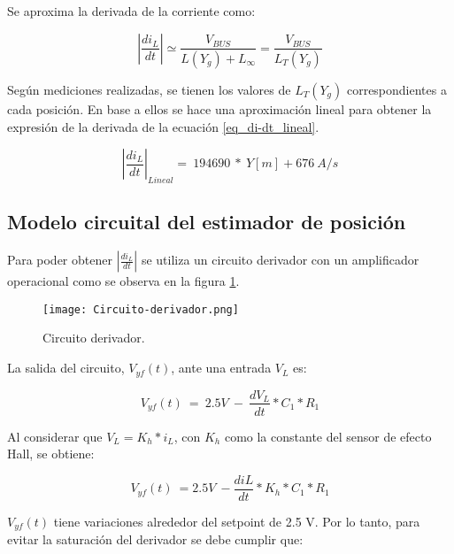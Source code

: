 \noindent Se aproxima la derivada de la corriente como:

\begin{equation} \label{eq_derivadaAproximacion}
	\left|\frac{{di}_L}{dt}\right|\simeq \frac{V_{BUS}}{L(Y_g)+L_{\infty }}=\frac{V_{BUS}}{L_T(Y_g)}
\end{equation}

\noindent Seg\'{u}n mediciones realizadas, se tienen los valores de $L_T(Y_g)$ correspondientes a cada posici\'{o}n. En base a ellos se hace una aproximaci\'{o}n lineal para obtener la expresi\'{o}n de la derivada de la ecuaci\'{o}n \ref{eq_di-dt_lineal}.

\noindent 

\begin{equation} \label{eq_di-dt_lineal}
{\left|\frac{{di}_L}{dt}\right|}_{Lineal}=\ 194690\ *\ Y[m]+676\ A/s
\end{equation}

\subsection{Modelo circuital del estimador de posici\'{o}n}

\noindent Para poder obtener $\left|\frac{{di}_L}{dt}\right|$ se utiliza un circuito derivador con un amplificador operacional como se observa en la figura  \ref{fig:img_Circuito-derivador}.

\begin{figure}[H]
	\centering
	\texttt{[image: Circuito-derivador.png]}
	\caption{Circuito derivador.}
	\label{fig:img_Circuito-derivador}
\end{figure}

\noindent La salida del circuito, $V_{yf}(t)$, ante una entrada $V_L$ es:

\begin{equation} \label{eq_vyf1}
	V_{yf}(t)\ =\ 2.5V\ -\ \frac{dV_L}{dt}*C_1*R_1
\end{equation}


\noindent Al considerar que $V_L=K_h*i_L$, con $K_h$ como la constante del sensor de efecto Hall, se obtiene: 

\begin{equation} \label{eq_vyf2}
	V_{yf}(t)\ =2.5V\ -\frac{diL}{dt}*K_h*C_1*R_1
\end{equation}

\noindent $V_{yf}(t)$ tiene variaciones alrededor del setpoint de 2.5 V. Por lo tanto, para evitar la saturaci\'{o}n del derivador se debe cumplir que:

